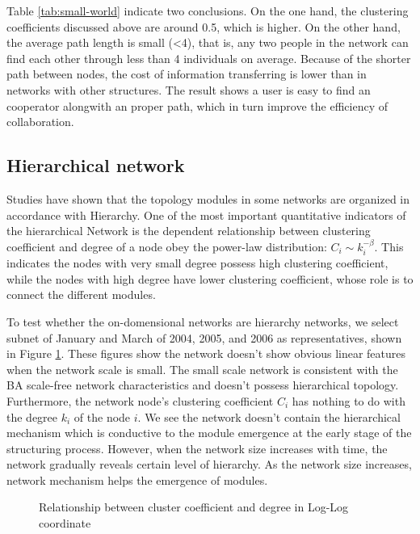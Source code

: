 \documentclass{elsarticle}
\begin{document}
Table \ref{tab:small-world} indicate two conclusions. On the one hand, the
clustering coefficients discussed above are around 0.5, which is higher. On the other
hand, the average path length is small (<4), that is, any two people
in the network can find each other through less than 4 individuals on
average. Because of the shorter path between nodes, the cost of
information transferring is lower than in
networks with other structures. The result shows a user is easy to find an cooperator
alongwith an proper path, which in turn improve the efficiency of collaboration.



 \subsection{Hierarchical network}
\label{sec:hierarchical-network}

Studies have shown that the topology modules in some networks are
organized in accordance with Hierarchy\cite{PhysRevE.67.026112,PhysRevE.65.066122}. One of the most
important quantitative indicators of the hierarchical Network is the
dependent relationship between clustering coefficient and degree of a
node obey
the power-law distribution: $C_i\sim k_i^{-\beta}$. This indicates the
nodes with very small degree possess high clustering coefficient,
while the nodes with high degree have lower clustering coefficient, whose role is to connect the different modules.

To test whether the on-domensional networks are hierarchy networks, we select subnet of  January and
March of 2004, 2005, and 2006  as representatives, shown in
Figure \ref{fig:hierarchy}. These figures show the  network doesn’t show obvious
linear features when the network scale is small. The small scale network is consistent with the
BA scale-free network characteristics and doesn’t possess hierarchical
topology. Furthermore, the network node’s clustering coefficient $C_i$
has nothing to do with the degree $k_i$ of the node $i$. We see the  network doesn’t contain the
hierarchical mechanism which is conductive to the module emergence at
the early stage of the structuring process. However, when the network
size increases with time, the network gradually reveals certain level
of hierarchy. As the
network size increases, network mechanism helps the emergence of
modules. 


\begin{figure}[htpb]
  \centering
  \subfigure[ ]{
     \scalebox{0.18}{\texttt{[image: 05-1]}}
   } \quad
  \subfigure[ ]{ 
       \scalebox{0.18}{\texttt{[image: 05-2]}}
   } 
  
    \subfigure[ ]{
     \scalebox{0.18}{\texttt{[image: 05-3]}}
   } \quad
  \subfigure[ ]{ 
       \scalebox{0.18}{\texttt{[image: 05-4]}}
   } 
   
    \subfigure[ ]{
     \scalebox{0.18}{\texttt{[image: 05-5]}}
   } \quad
  \subfigure[ ]{ 
       \scalebox{0.18}{\texttt{[image: 05-6]}}
   } 
   \caption{Relationship between cluster coefficient and degree in
     Log-Log coordinate}
   \label{fig:hierarchy}
\end{figure}
\end{document}
